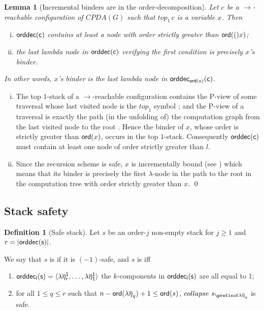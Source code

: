 \documentclass[a4paper]{article}
\newtheorem{lemma}{Lemma}[section]
\theoremstyle{remark}
\theoremstyle{definition}
\newtheorem{definition}{Definition}[section]
\newcommand\orddec{\sf orddec}
\begin{document}
\begin{lemma}[Incremental binders are in the order-decomposition]
\label{lem:binder_in_ordecompos} Let $c$ be a $\rightarrow$-reachable
configuration of $CPDA(G)$ such that $top_1\,c$ is a variable $x$. Then
\begin{enumerate}[i.]
\item $\orddec(c)$ contains at least a node with order strictly greater than ${\sf ord}(()x)$;
\item the last lambda node in $\orddec(c)$ verifying the first condition is precisely $x$'s binder.
\end{enumerate}
In other words, $x$'s binder is the last lambda node in $\orddec_{\ord x}(c)$.
\end{lemma}
\proof
\begin{enumerate}[i.]
\item The top $1$-stack of a $\rightarrow$-reachable configuration contains the P-view of some traversal whose last visited node is the $top_1$ symbol \cite[Corollary 8]{hague-collaps-full}; and
    the P-view of a traversal is exactly the path (in the unfolding of) the
    computation graph from the last visited node to
    the root \cite[Proposition 6]{OngLics2006}. Hence the binder of $x$, whose order
    is strictly greater than ${\sf ord}(x)$, occurs in the top $1$-stack.
    Consequently $\orddec(c)$ must contain at least one node of order strictly greater than $l$.

\item Since the recursion scheme is safe, $x$ is
 incrementally bound (see \cite{blumong:safelambdacalculus})
 which means that its binder is precisely the first $\lambda$-node in the
 path to the root in the computation tree with order strictly
 greater than $x$. \qed
\end{enumerate}

\subsection{Stack safety}

\begin{definition}[Safe stack]
\label{dfn:safestack} Let $s$ be an order-$j$ non-empty stack for $j\geq1$ and $r
= |\orddec(s)|$.

We say that $s$ is  if it is $(-1)$-safe,
and $s$ is  iff
    \begin{enumerate}[1.]
    \item $\orddec_l(s) = \langle \lambda \overline\eta_r^1, \ldots ,
    \lambda \overline{\eta}_1^1 \rangle$ \ie the $k$-components in $\orddec_l(s)$ are all equal to $1$;

    \item for all $1 \leq q \leq r$ such that $n-{\sf ord}(\lambda \overline\eta_q)+1 \leq {\sf ord}(s)$,
    $collapse~s_{\prefixof \lambda\overline\eta_q}$ is safe.
    \end{enumerate}

\end{definition}
\end{document}
